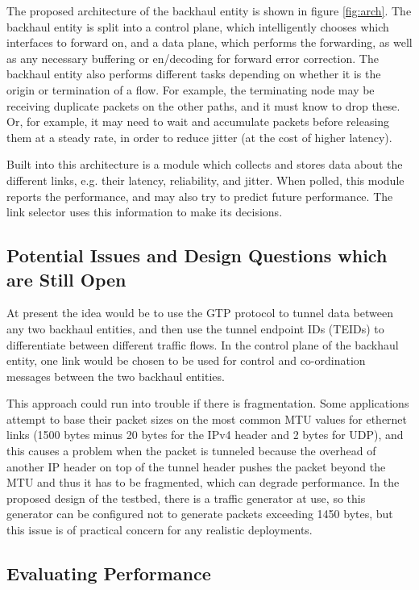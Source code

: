 The proposed architecture of the backhaul entity is shown in figure \ref{fig:arch}. The backhaul entity is split into a control plane, which intelligently chooses which interfaces to forward on, and a data plane, which performs the forwarding, as well as any necessary buffering or en/decoding for forward error correction. The backhaul entity also performs different tasks depending on whether it is the origin or termination of a flow. For example, the terminating node may be receiving duplicate packets on the other paths, and it must know to drop these. Or, for example, it may need to wait and accumulate packets before releasing them at a steady rate, in order to reduce jitter (at the cost of higher latency).

Built into this architecture is a module which collects and stores data about the different links, e.g. their latency, reliability, and jitter. When polled, this module reports the performance, and may also try to predict future performance. The link selector uses this information to make its decisions.

\subsection{Potential Issues and Design Questions which are Still Open}

At present the idea would be to use the GTP protocol to tunnel data between any two backhaul entities, and then use the tunnel endpoint IDs (TEIDs) to differentiate between different traffic flows. In the control plane of the backhaul entity, one link would be chosen to be used for control and co-ordination messages between the two backhaul entities.

This approach could run into trouble if there is fragmentation. Some applications attempt to base their packet sizes on the most common MTU values for ethernet links (1500 bytes  minus 20 bytes for the IPv4 header and 2 bytes for UDP), and this causes a problem when the packet is tunneled because the overhead of another IP header on top of the tunnel header pushes the packet beyond the MTU and thus it has to be fragmented, which can degrade performance. In the proposed design of the testbed, there is a traffic generator at use, so this generator can be configured not to generate packets exceeding 1450 bytes, but this issue is of practical concern for any realistic deployments.

\subsection{Evaluating Performance}

